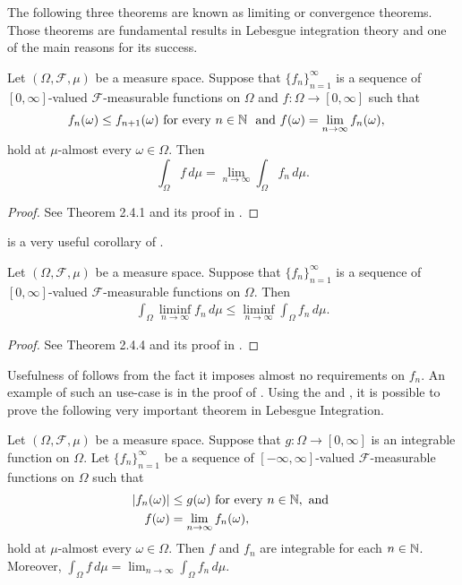 The following three theorems are known as limiting or convergence theorems. Those theorems are fundamental results in Lebesgue integration theory and one of the main reasons for its success.

\begin{theorem}
\label{thm:mct}
Let $(\Omega, \mathcal{F}, \mu)$ be a measure space. Suppose that $\{ f_n \}_{n=1}^\infty$ is a sequence of $[0, \infty]$-valued $\mathcal{F}$-measurable functions on $\Omega$ and $f : \Omega \to [0, \infty]$ such that \begin{align*}
    f_n (\omega) &\leq f_{n + 1}(\omega) \text{ for every $n \in {\mathbb N}$ } \text{ and } f (\omega) = \lim_{n \to \infty} f_n(\omega),
\end{align*}
hold at $\mu$-almost every $\omega \in \Omega$. Then \[ 
    \int_{\Omega} f \, d\mu = \lim_{n \to \infty} \int_\Omega f_n \, d\mu.
\]
\end{theorem}
\begin{proof}
See Theorem 2.4.1 and its proof in \cite{cohn_2013_measure}.
\end{proof}
 is a very useful corollary of .
\begin{theorem}
\label{thm:fatou}
Let $(\Omega, \mathcal{F}, \mu)$ be a measure space. Suppose that $\{ f_n \}_{n=1}^\infty$ is a sequence of $[0, \infty]$-valued $\mathcal{F}$-measurable functions on $\Omega$. Then
\begin{align*}
    \int_{\Omega} \liminf_{n \to \infty} f_n \, d\mu \leq  \liminf_{n \to \infty} \int_{\Omega} f_n \, d\mu.
\end{align*}
\end{theorem}
\begin{proof}
See Theorem 2.4.4 and its proof in \cite{cohn_2013_measure}.
\end{proof}
\begin{remark}
Usefulness of  follows from the fact it imposes almost no requirements on $f_n$. An example of such an use-case is in the proof of . Using the  and , it is possible to prove the following very important theorem in Lebesgue Integration.
\end{remark}
\begin{theorem}
\label{thm:dct}
Let $(\Omega, \mathcal{F}, \mu)$ be a measure space. Suppose that $g : \Omega \to [0, \infty]$ is an integrable function on $\Omega$. Let $\{ f_n \}_{n=1}^\infty$ be a sequence of $[-\infty, \infty]$-valued $\mathcal{F}$-measurable functions on $\Omega$ such that
\begin{align*}
      |f_n (\omega)| &\leq g(\omega) \text{ for every $n \in {\mathbb N}$}, \text{ and }  \\
      f (\omega) &= \lim_{n \to \infty} f_n(\omega) ,
\end{align*}
hold at $\mu$-almost every $\omega \in \Omega$. Then $f$ and $f_n$ are integrable for each $n \in {\mathbb N}$. Moreover, $\int_\Omega f \, d \mu = \lim_{n \to \infty} \int_\Omega f_n \, d \mu$.
\end{theorem}
